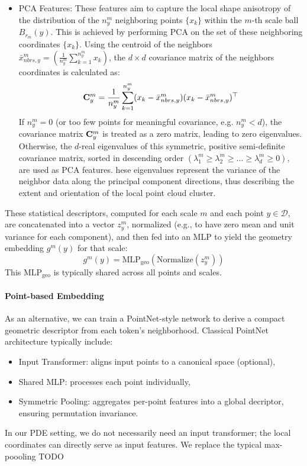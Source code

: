 \documentclass[reqno,10pt]{amsart}
\theoremstyle{plain}
\theoremstyle{definition}
\newcommand{\cal}[1]{\mathcal{#1}}
\begin{document}
\begin{itemize}
    \item PCA Features: These features aim to capture the local shape anisotropy of the distribution of the $n_y^m$ neighboring points $\{x_k\}$ within the $m$-th scale ball $B_{r_m}(y)$. This is achieved by performing PCA on the set of these neighboring coordinates $\{x_k\}$. Using the centroid of the neighbors $\bar{x}^m_{nbrs,y} = \left(\frac{1}{n^m_y} \sum_{k=1}^{n^m_y} x_k\right)$, the $d \times d$ covariance matrix of the neighbors coordinates is calculated as:
    \begin{equation}
        {\bf C}^m_y = \frac{1}{n^m_y} \sum_{k=1}^{n^m_y}(x_k - \bar{x}^m_{nbrs,y})(x_k - \bar{x}^m_{nbrs,y})^\top
    \end{equation}
    If $n^m_y = 0$ (or too few points for meaningful covariance, e.g. $n^m_y < d$), the covariance matrix ${\bf C}^m_y$ is treated as a zero matrix, leading to zero eigenvalues. Otherwise, the $d$-real eigenvalues of this symmetric, positive semi-definite covariance matrix, sorted in descending order $(\lambda^m_1 \geq \lambda^m_2 \geq \dots \geq \lambda^m_d \geq 0),$ are used as PCA features. hese eigenvalues represent the variance of the neighbor data along the principal component directions, thus describing the extent and orientation of the local point cloud cluster.
\end{itemize}
These statistical descriptors, computed for each scale $m$ and each point $y \in \cal D$, are concatenated into a vector $z^m_y$, normalized (e.g., to have zero mean and unit variance for each component), and then fed into an MLP to yield the geometry embedding $g^m(y)$ for that scale:
\begin{equation}
    g^m(y) = \text{MLP}_{\text{geo}}(\text{Normalize}(z^m_y))
\end{equation} 
This $\text{MLP}_{\text{geo}}$ is typically shared across all points and scales.

\paragraph{\bf Point-based Embedding} As an alternative, we can train a PointNet-style network \cite{QC2017} to derive a compact geometric descriptor from each token's neighborhood. Classical PointNet architecture typically include:
\begin{itemize}
    \item Input Transformer: aligns input points to a canonical space (optional),
    \item Shared MLP: processes each point individually,
    \item Symmetric Pooling: aggregates per-point features into a global decriptor, ensuring permutation invariance.
\end{itemize}
In our PDE setting, we do not necessarily need an input transformer; the local coordinates can directly serve as input features. We replace the typical max-poooling TODO
\end{document}
